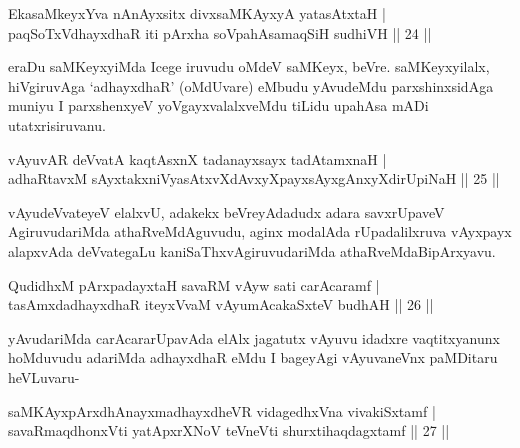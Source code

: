 
\begin{shl}
EkasaMkeyxYva nAnAyx\s sitx divxsaMKAyxyA yatasAtxtaH |\\
paqSoTxV\s dhayxdhaR iti pArxha soVpahAsamaqSiH sudhiVH \hfill || 24 ||
\end{shl}

\begin{artha}
eraDu saMKeyxyiMda Icege iruvudu oMdeV saMKeyx, beVre. saMKeyx\-yilalx, hiVgiruvAga `adhayxdhaR' (oMdUvare) eMbudu yAvudeMdu parxshinxsidAga muni\-yu I parxshenxyeV yoVgayxvalalxveMdu tiLidu upahAsa mADi utatxrisiruvanu.
\end{artha}

\begin{shl}
vAyuvAR deVvatA kaqtAsxnX tadanayxsayx tadAtamxnaH |\\
adhaRtavxM sAyxtakxniVyasAtxvXdAvxyXpayxsAyxgAnxyXdirUpiNaH \hfill || 25 ||
\end{shl}

\begin{artha}
vAyudeVvateyeV elalxvU, adakekx beVreyAdadudx adara savxrUpaveV AgiruvudariMda athaRveMdAguvudu, aginx modalAda rUpadalilxruva vAyxpayx alapxvAda deVvategaLu kaniSaThxvAgiruvudariMda athaRveMdaBipArxyavu.
\end{artha}


\begin{shl}
QudidhxM pArxpadayxtaH savaRM vAyw sati carAcaramf |\\
tasAmxdadhayxdhaR iteyxVvaM vAyumAcakaSxteV budhAH \hfill || 26 ||
\end{shl}

\begin{artha}
yAvudariMda carAcararUpavAda elAlx jagatutx vAyuvu idadxre vaqtitx\-yanunx hoMduvudu adariMda adhayxdhaR eMdu I bageyAgi vAyuvaneVnx paMDitaru heVLuvaru-
\end{artha}

\begin{shl}
\footnotemark[1]{}saMKAyxpArxdhAnayxmadhayxdheVR vidagedhxVna vivakiSxtamf |\\
savaRmaqdhonxVti yatApxrXNoV teVneVti shurxtihaqdagxtamf \hfill || 27 ||
\end{shl}

